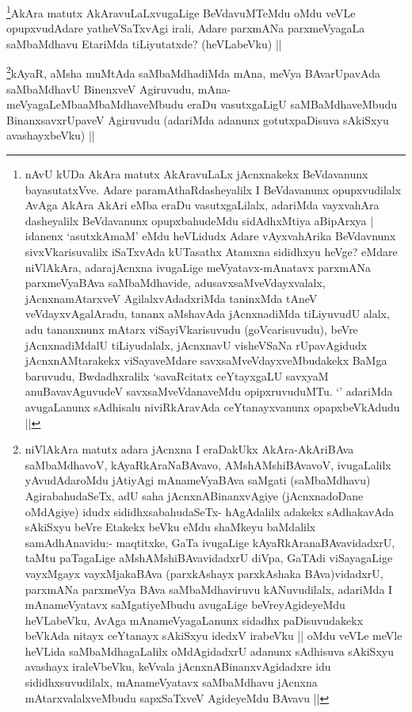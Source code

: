 \begin{artha}
\footnote{nAvU kUDa AkAra matutx AkAravuLaLx jAcnxnakekx BeVdavanunx bayasutatxVve. Adare paramAthaRdasheyalilx I BeVdavanunx opupxvudilalx AvAga AkAra AkAri eMba eraDu vasutxgaLilalx, adariMda vayxvahAra dasheyalilx BeVdavanunx opupxbahudeMdu sidAdhxMtiya aBipArxya | idanenx `asutxkAmaM' eMdu heVLidudx Adare vAyxvahArika BeVdavnunx sivxVkarisuvalilx iSaTxvAda kUTasathx Atamxna sididhxyu heVge? eMdare niVlAkAra, adarajAcnxna ivugaLige meVyatavx-mAnatavx parxmANa parxmeVyaBAva saMbaMdhavide, adusavxsaMveVdayxvalalx, jAcnxnamAtarxveV AgilalxvAdadxriMda taninxMda tAneV veVdayxvAgalAradu, tananx aMshavAda jAcnxnadiMda tiLiyuvudU alalx, adu tananxnunx mAtarx viSayiVkarisuvudu (goVcarisuvudu), beVre jAcnxnadiMdalU tiLiyudalalx, jAcnxnavU visheVSaNa rUpavAgidudx jAcnxnAMtarakekx viSayaveMdare savxsaMveVdayxveMbudakekx BaMga baruvudu, Bwdadhxralilx `savaRcitatx ceYtayxgaLU savxyaM anuBavavAguvudeV savxsaMveVdanaveMdu opipxruvuduMTu. `\stext' adariMda avugaLanunx sAdhisalu niviRkAravAda ceYtanayxvanunx opapxbeVkAdudu ||}AkAra matutx AkAravuLaLxvugaLige BeVdavuMTeMdu oMdu veVLe opupxvudAdare yatheVSaTxvAgi irali, Adare parxmANa parxmeVyagaLa saMbaMdhavu EtariMda tiLiyutatxde? (heVLabeVku) ||
\end{artha}

\begin{artha}
\footnote{niVlAkAra matutx adara jAcnxna I eraDakUkx AkAra-AkAriBAva saMbaMdhavoV, kAyaRkAraNaBAvavo, AMshAMshiBAvavoV, ivugaLalilx yAvudAdaroMdu jAtiyAgi mAnameVyaBAva saMgati (saMbaMdhavu) AgirabahudaSeTx, adU saha jAcnxnABinanxvAgiye (jAcnxnadoDane oMdAgiye) idudx sididhxsabahudaSeTx- hAgAdalilx adakekx sAdhakavAda sAkiSxyu beVre Etakekx beVku eMdu shaMkeyu baMdalilx samAdhAnavidu:- maqtitxke, GaTa ivugaLige kAyaRkAranaBAvavidadxrU, taMtu paTagaLige aMshAMshiBAvavidadxrU diVpa, GaTAdi viSayagaLige vayxMgayx vayxMjakaBAva (parxkAshayx parxkAshaka BAva)vidadxrU, parxmANa parxmeVya BAva saMbaMdhaviruvu kANuvudilalx, adariMda I mAnameVyatavx saMgatiyeMbudu avugaLige beVreyAgideyeMdu heVLabeVku, AvAga mAnameVyagaLanunx sidadhx paDisuvudakekx beVkAda nitayx ceYtanayx sAkiSxyu idedxV irabeVku || oMdu veVLe meVle heVLida saMbaMdhagaLalilx oMdAgidadxrU adanunx sAdhisuva sAkiSxyu avashayx iraleVbeVku, keVvala jAcnxnABinanxvAgidadxre idu sididhxsuvudilalx, mAnameVyatavx saMbaMdhavu jAcnxna mAtarxvalalxveMbudu sapxSaTxveV AgideyeMdu BAvavu ||}kAyaR, aMsha muMtAda saMbaMdhadiMda mAna, meVya BAvarUpavAda saMbaMdhavU BinenxveV Agiruvudu, mAna-meVyagaLeMbaaMbaMdhaveMbudu eraDu vasutxgaLigU saMBaMdhaveMbudu BinanxsavxrUpaveV Agiruvudu (adariMda adanunx gotutxpaDisuva sAkiSxyu avashayxbeVku) ||
\end{artha}

